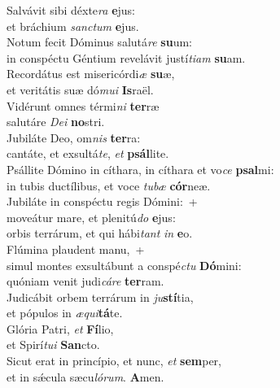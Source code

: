 \evenverse Salvávit sibi déxte\textit{ra} \textbf{e}jus:~\*\\
\evenverse et bráchium \textit{san}\textit{ctum} \textbf{e}jus.\\
\oddverse Notum fecit Dóminus salutá\textit{re} \textbf{su}um:~\*\\
\oddverse in conspéctu Géntium revelávit justí\textit{ti}\textit{am} \textbf{su}am.\\
\evenverse Recordátus est misericórdi\textit{æ} \textbf{su}æ,~\*\\
\evenverse et veritátis suæ dó\textit{mu}\textit{i} \textbf{Is}raël.\\
\oddverse Vidérunt omnes térmi\textit{ni} \textbf{ter}ræ~\*\\
\oddverse salutáre \textit{De}\textit{i} \textbf{no}stri.\\
\evenverse Jubiláte Deo, om\textit{nis} \textbf{ter}ra:~\*\\
\evenverse cantáte, et exsultá\textit{te}, \textit{et} \textbf{psál}lite.\\
\oddverse Psállite Dómino in cíthara, in cíthara et vo\textit{ce} \textbf{psal}mi:~\*\\
\oddverse in tubis ductílibus, et voce \textit{tu}\textit{bæ} \textbf{cór}neæ.\\
\evenverse Jubiláte in conspéctu regis Dómini:~+\\
\evenverse  moveátur mare, et plenitú\textit{do} \textbf{e}jus:~\*\\
\evenverse orbis terrárum, et qui hábi\textit{tant} \textit{in} \textbf{e}o.\\
\oddverse Flúmina plaudent manu,~+\\
\oddverse  simul montes exsultábunt a conspé\textit{ctu} \textbf{Dó}mini:~\*\\
\oddverse quóniam venit judi\textit{cá}\textit{re} \textbf{ter}ram.\\
\evenverse Judicábit orbem terrárum in \textit{ju}\textbf{stí}tia,~\*\\
\evenverse et pópulos in \textit{æ}\textit{qui}\textbf{tá}te.\\
\oddverse Glória Patri, \textit{et} \textbf{Fí}lio,~\*\\
\oddverse et Spirí\textit{tu}\textit{i} \textbf{San}cto.\\
\evenverse Sicut erat in princípio, et nunc, \textit{et} \textbf{sem}per,~\*\\
\evenverse et in sǽcula sæcu\textit{ló}\textit{rum}. \textbf{A}men.\\
